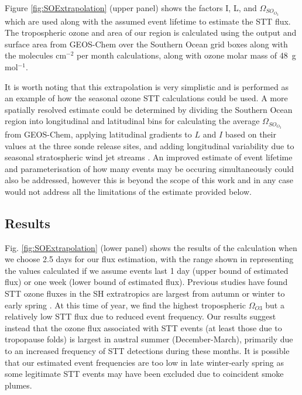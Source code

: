     Figure \ref{fig:SOExtrapolation} (upper panel) shows the factors I, L, and $\Omega_{SO_{O_3}}$ which are used along with the assumed event lifetime to estimate the STT flux.
    The tropospheric ozone and area of our region is calculated using the output and surface area from GEOS-Chem over the Southern Ocean grid boxes along with the molecules cm$^{-2}$ per month calculations, along with ozone molar mass of 48~g mol$^{-1}$.
    
    It is worth noting that this extrapolation is very simplistic and is performed as an example of how the seasonal ozone STT calculations could be used.
    A more spatially resolved estimate could be determined by dividing the Southern Ocean region into longitudinal and latitudinal bins for calculating the average $\Omega_{SO_{O_3}}$ from GEOS-Chem, applying latitudinal gradients to $L$ and $I$ based on their values at the three sonde release sites, and adding longitudinal variability due to seasonal stratospheric wind jet streams \citep{Baray2012,Skerlak2015}.
    An improved estimate of event lifetime and parameterisation of how many events may be occuring simultaneously could also be addressed, however this is beyond the scope of this work and in any case would not address all the limitations of the estimate provided below.
  \subsection{Results}
    
    Fig. \ref{fig:SOExtrapolation} (lower panel) shows the results of the calculation when we choose 2.5 days for our flux estimation, with the range shown in representing the values calculated if we assume events last 1 day (upper bound of estimated flux) or one week (lower bound of estimated flux).
    Previous studies have found STT ozone fluxes in the SH extratropics are largest from autumn or winter to early spring \citep{Olsen2003, Liu2016}.
    At this time of year, we find the highest tropospheric $\Omega_{O3}$ but a relatively low STT flux due to reduced event frequency.
    Our results suggest instead that the ozone flux associated with STT events (at least those due to tropopause folds) is largest in austral summer (December-March), primarily due to an increased frequency of STT detections during these months.
    It is possible that our estimated event frequencies are too low in late winter-early spring as some legitimate STT events may have been excluded due to coincident smoke plumes.
    
